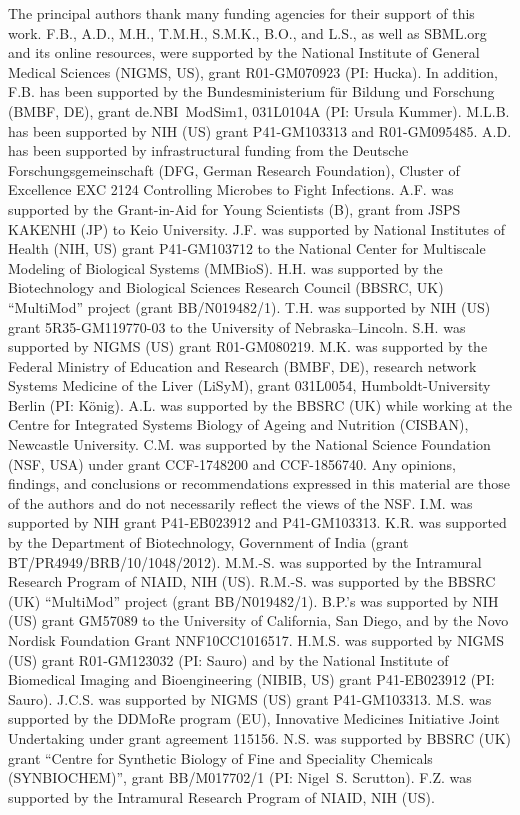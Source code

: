 \documentclass{sbml-paper}
\begin{document}
The principal authors thank many funding agencies for their support of this work.  F.B., A.D., M.H., T.M.H., S.M.K., B.O., and L.S., as well as SBML.org and its online resources, were supported by the National Institute of General Medical Sciences (NIGMS, US), grant \No R01-GM070923 (PI: Hucka).  In addition, F.B. has been supported by the Bundesministerium f\"{u}r Bildung und Forschung (BMBF, DE), grant \No de.NBI~ModSim1, 031L0104A (PI: Ursula Kummer).  M.L.B. has been supported by NIH (US) grant \No P41-GM103313 and R01-GM095485.  A.D. has been supported by infrastructural funding from the Deutsche Forschungsgemeinschaft (DFG, German Research Foundation), Cluster of Excellence EXC 2124 Controlling Microbes to Fight Infections.  A.F. was supported by the Grant-in-Aid for Young Scientists (B), grant  from JSPS KAKENHI (JP) to Keio University.  J.F. was supported by National Institutes of Health (NIH, US) grant \No P41-GM103712 to the National Center for Multiscale Modeling of Biological Systems (MMBioS).  H.H. was supported by the Biotechnology and Biological Sciences Research Council (BBSRC, UK) ``MultiMod'' project (grant \No BB/N019482/1).  T.H. was supported by NIH (US) grant \No 5R35-GM119770-03 to the University of Nebraska--Lincoln.  S.H. was supported by NIGMS (US) grant \No R01-GM080219.  M.K. was supported by the Federal Ministry of Education and Research (BMBF, DE), research network Systems Medicine of the Liver (LiSyM), grant \No 031L0054, Humboldt-University Berlin (PI: K\"{o}nig).  A.L. was supported by the BBSRC (UK) while working at the Centre for Integrated Systems Biology of Ageing and Nutrition (CISBAN), Newcastle University.  C.M. was supported by the National Science Foundation (NSF, USA) under grant \No CCF-1748200 and CCF-1856740.  Any opinions, findings, and conclusions or recommendations expressed in this material are those of the authors and do not necessarily reflect the views of the NSF.  I.M. was supported by NIH grant \No P41-EB023912 and P41-GM103313.  K.R. was supported by the Department of Biotechnology, Government of India (grant \No BT/PR4949/BRB/10/1048/2012).  M.M.-S. was supported by the Intramural Research Program of NIAID, NIH (US).  R.M.-S. was supported by the BBSRC (UK) ``MultiMod'' project (grant \No BB/N019482/1).  B.P.'s was supported by NIH (US) grant \No GM57089 to the University of California, San Diego, and by the Novo Nordisk Foundation Grant \No NNF10CC1016517.  H.M.S. was supported by NIGMS (US) grant \No R01-GM123032 (PI: Sauro) and by the National Institute of Biomedical Imaging and Bioengineering (NIBIB, US) grant \No P41-EB023912 (PI: Sauro).  J.C.S. was supported by NIGMS (US) grant P41-GM103313.  M.S. was supported by the DDMoRe program (EU), Innovative Medicines Initiative Joint Undertaking under grant agreement 115156.  N.S. was supported by BBSRC (UK) grant ``Centre for Synthetic Biology of Fine and Speciality Chemicals (SYNBIOCHEM)'', grant \No BB/M017702/1 (PI: Nigel~S. Scrutton).  F.Z. was supported by the Intramural Research Program of NIAID, NIH (US).
\end{document}
